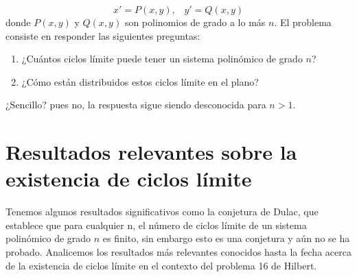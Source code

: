 \documentclass[12pt, a4paper]{report}
\begin{document}
\begin{equation}
	x'=P\left(x,y\right)\text{, }\text{  }y'=Q\left(x,y\right)
\end{equation}
donde $P\left(x,y\right)$ y $Q\left(x,y\right)$ son polinomios de grado a lo más $n$. El problema consiste en responder las siguientes preguntas:
\begin{enumerate}
	\item ¿Cuántos ciclos límite puede tener un sistema polinómico de grado $n$?
	\item ¿Cómo están distribuidos estos ciclos límite en el plano?
\end{enumerate}

¿Sencillo? pues no, la respuesta sigue siendo desconocida para $n>1$.

\section{Resultados relevantes sobre la existencia de ciclos límite}

Tenemos algunos resultados significativos como la conjetura de Dulac, que establece que para cualquier n, el número de ciclos límite de un sistema polinómico de grado $n$ es finito, sin embargo esto es una conjetura y aún no se ha probado.  Analicemos los resultados más relevantes conocidos hasta la fecha acerca de la existencia de ciclos límite en el contexto del problema 16 de Hilbert.
\end{document}
